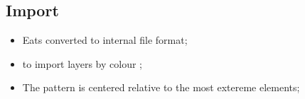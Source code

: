 \subsection{Import}
\begin{itemize}
\item Eats  \ira converted to internal file format;
\item {} to  import layers  by colour  \hfill {}\ec;
\item The pattern is centered relative to the most extereme elements;
\end{itemize}

